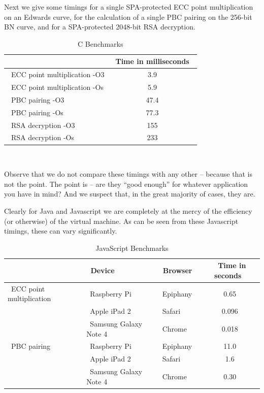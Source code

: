 \documentclass{llncs}
\begin{document}
Next we give some timings for a single SPA-protected ECC point multiplication on an Edwards curve, for the calculation of a single PBC pairing on the 256-bit BN curve, and for a SPA-protected 2048-bit RSA decryption.

\begin{table}
\centering
\begin{tabular}{|l|c|}
\hline
&~Time in milliseconds~\\
\hline
~ECC point multiplication -O3 & 3.9  \\ %
~ECC point multiplication -Os & 5.9 \\ %
~PBC pairing -O3 & 47.4 \\ %
~PBC pairing -Os & 77.3 \\ %
~RSA decryption -O3 & 155 \\  %
~RSA decryption -Os & 233 \\  %
\hline
\end{tabular}
~\\
\caption{C Benchmarks}
\label{cspeed}
\end{table}

Observe that we do not compare these timings with any other -- because that is not the point.
The point is -- are they ``good enough'' for whatever application you have in mind? And we suspect that, in the great majority of cases, they are.

Clearly for Java and Javascript we are completely at the mercy of the efficiency (or otherwise) of the virtual machine. As can be seen from these Javascript timings, these
can vary significantly.


\begin{table}
\centering
\begin{tabular}{|l|l|l|c|}
\hline
 & ~Device~ & ~Browser~ &~Time in seconds~\\
\hline
~ECC point multiplication~  & ~Raspberry Pi~ & ~Epiphany~ & 0.65  \\
  & ~Apple iPad 2~ & ~Safari~ & 0.096  \\
  & ~Samsung Galaxy Note 4~ & ~Chrome~ & 0.018  \\
~PBC pairing~  &  ~Raspberry Pi~ & ~Epiphany~ & 11.0\\
 &  ~Apple iPad 2~ & ~Safari~ & 1.6\\
 &  ~Samsung Galaxy Note 4~ & ~Chrome~ & 0.30\\
\hline
\end{tabular}
~\\
\caption{JavaScript Benchmarks}
\label{jsspeed}
\end{table}
\end{document}
